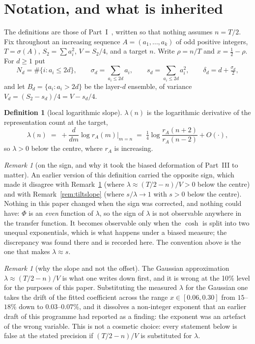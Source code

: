 \documentclass[11pt,a4paper]{article}
\theoremstyle{plain}
\theoremstyle{definition}
\newtheorem{definition}[theorem]{Definition}
\theoremstyle{remark}
\newtheorem{remark}[theorem]{Remark}
\begin{document}
\section{Notation, and what is inherited}\label{sec:notation}

The definitions are those of Part~I~\cite{P1}, written so that nothing assumes $n=T/2$.
Fix throughout an increasing sequence $A=(a_1,\dots,a_k)$ of odd positive integers,
$T=\sigma(A)$, $S_2=\sum a_i^2$, $V=S_2/4$, and a target $n$. Write $\rho=n/T$ and
$x=\tfrac12-\rho$. For $d\ge1$ put
\[
  N_d=\#\{i:a_i\le2d\},\qquad
  \sigma_d=\!\!\sum_{a_i\le 2d}\!\! a_i,\qquad
  s_d=\!\!\sum_{a_i\le 2d}\!\! a_i^{2},\qquad
  \delta_d=d+\tfrac{\sigma_d}{2},
\]
and let $B_d=\{a_i:a_i>2d\}$ be the layer-$d$ ensemble, of variance
$V_d=(S_2-s_d)/4=V-s_d/4$.

\begin{definition}[local logarithmic slope]\label{def:slope}
$\lambda(n)$ is the logarithmic derivative of the representation count at the target,
\[
  \lambda(n)\;=\;+\frac{d}{dm}\log r_A(m)\Big|_{m=n}
  \;=\;\tfrac14\log\frac{r_A(n+2)}{r_A(n-2)}+O(\cdot),
\]
so $\lambda>0$ below the centre, where $r_A$ is increasing.
\end{definition}

\begin{remark}[on the sign, and why it took the biased deformation of Part~III to matter]\label{rem:sign}
An earlier version of this definition carried the opposite sign, which made it disagree with
Remark~\ref{rem:whyslope} (where $\lambda\approx(T/2-n)/V>0$ below the centre) and with
Remark~\ref{rem:tiltslope} (where $s/\lambda\to1$ with $s>0$ below the centre). Nothing in
this paper changed when the sign was corrected, and nothing could have: $\Phi$ is an
\emph{even} function of $\lambda$, so the sign of $\lambda$ is not observable anywhere in the
transfer function. It becomes observable only when the $\cosh$ is split into two unequal
exponentials, which is what happens under a biased measure; the discrepancy was found there
and is recorded here. The convention above is the one that makes $\lambda\approx s$.
\end{remark}

\begin{remark}[why the slope and not the offset]\label{rem:whyslope}
The Gaussian approximation $\lambda\approx(T/2-n)/V$ is what one writes down first, and it is
wrong at the 10\% level for the purposes of this paper. Substituting the measured $\lambda$
for the Gaussian one takes the drift of the fitted coefficient across the range
$x\in[0.06,0.30]$ from $15$--$18\%$ down to $0.03$--$0.07\%$, and it dissolves a non-integer
exponent that an earlier draft of this programme had reported as a finding: the exponent was
an artefact of the wrong variable. This is not a cosmetic
choice: every statement below is false at the stated precision if $(T/2-n)/V$ is substituted
for $\lambda$.
\end{remark}
\end{document}
